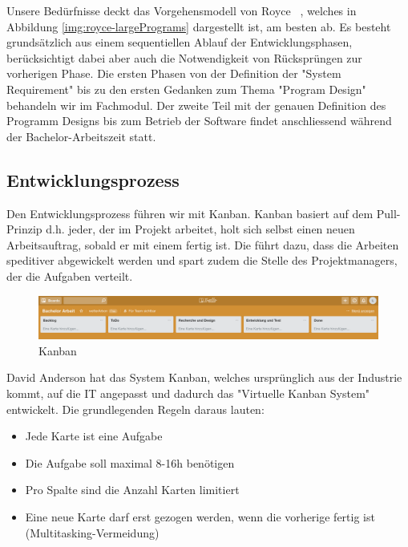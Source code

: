 Unsere Bedürfnisse deckt das Vorgehensmodell von Royce ~\cite{Royce1970}, welches in Abbildung  \ref{img:royce-largePrograms} dargestellt ist, am besten ab. Es besteht grundsätzlich aus einem sequentiellen Ablauf der Entwicklungsphasen, berücksichtigt dabei aber auch die Notwendigkeit von Rücksprüngen zur vorherigen Phase.
Die ersten Phasen von der Definition der "System Requirement" bis zu den ersten Gedanken zum Thema "Program Design" behandeln wir im Fachmodul. Der zweite Teil mit der genauen Definition des Programm Designs bis zum Betrieb der Software findet anschliessend während der Bachelor-Arbeitszeit statt.


\subsection{Entwicklungsprozess}
Den Entwicklungsprozess führen wir mit Kanban. Kanban basiert auf dem Pull-Prinzip d.h. jeder, der im Projekt arbeitet, holt sich selbst einen neuen Arbeitsauftrag, sobald er mit einem fertig ist. Die führt dazu, dass die Arbeiten speditiver abgewickelt werden und spart zudem die Stelle des Projektmanagers, der die Aufgaben verteilt.

\begin{figure}[htbp]
	\centering
	\includegraphics[width=1\linewidth]{img/kanban}
	\caption{Kanban}
	\label{img:kanban}
\end{figure}


David Anderson \cite{AndersonDavidJ2011K:eC} hat das System Kanban, welches ursprünglich aus der Industrie kommt, auf die IT angepasst und dadurch das "Virtuelle Kanban System" entwickelt. Die grundlegenden Regeln daraus lauten:

\begin{itemize}  
\item Jede Karte ist eine Aufgabe
\item Die Aufgabe soll maximal 8-16h benötigen
\item Pro Spalte sind die Anzahl Karten limitiert
\item Eine neue Karte darf erst gezogen werden, wenn die vorherige fertig ist (Multitasking-Vermeidung)
\end{itemize}


